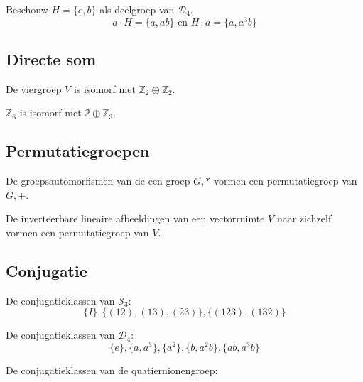 \documentclass[main.tex]{subfiles}
\begin{document}
\begin{vb}
  Beschouw $H = \{e,b\}$ als deelgroep van $\mathcal{D}_{4}$.
  \[ a\cdot H = \{a,ab\} \text{ en } H \cdot a = \{ a,a^{3}b \} \]
\end{vb}

\subsection{Directe som}


\begin{vb}
  De viergroep $V$ is isomorf met $\mathbb{Z}_{2} \oplus \mathbb{Z}_{2}$.
\end{vb}

\begin{vb}
  $\mathbb{Z}_{6}$ is isomorf met $\mathbb{2} \oplus \mathbb{Z}_{3}$.
\end{vb}

\subsection{Permutatiegroepen}


\begin{vb}
  De groepsautomorfismen van de een groep $G,*$ vormen een permutatiegroep van $G,+$.
\end{vb}

\begin{vb}
  De inverteerbare lineaire afbeeldingen van een vectorruimte $V$ naar zichzelf vormen een permutatiegroep van $V$.
\end{vb}

\subsection{Conjugatie}


\begin{vb}
  De conjugatieklassen van $\mathcal{S}_{3}$:
  \[ \{I\}, \{(12),(13),(23)\}, \{(123),(132)\} \]
\end{vb}

\begin{vb}
  De conjugatieklassen van $\mathcal{D_{4}}$:
  \[ \{e\}, \{a,a^{3}\}, \{a^{2}\}, \{b,a^{2}b\}, \{ab,a^{3}b\} \]
\end{vb}

\begin{vb}
  De conjugatieklassen van de quatiernionengroep:
\end{vb}

\end{document}
